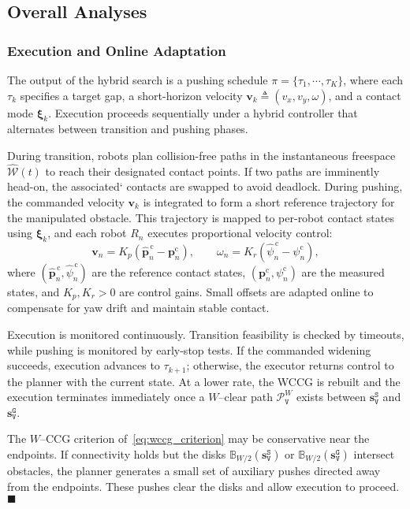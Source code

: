 \subsection{Overall Analyses}\label{subsec:overall}

\subsubsection{Execution and Online Adaptation}\label{subsec:execute}
The output of the hybrid search is a pushing schedule
$\pi=\{\tau_1,\cdots,\tau_K\}$, where each $\tau_k$ specifies a target gap, a
short-horizon velocity $\mathbf{v}_k\triangleq(v_x,v_y,\omega)$, and a contact
mode $\boldsymbol{\xi}_k$. Execution proceeds sequentially under a hybrid
controller that alternates between transition and pushing phases.

During transition, robots plan collision-free paths in the
instantaneous freespace $\widehat{\mathcal{W}}(t)$ to reach their designated
contact points. If two paths are imminently head-on, the associated`
contacts are swapped to avoid deadlock.
During pushing, the commanded velocity $\mathbf{v}_k$ is integrated to form a
short reference trajectory for the manipulated obstacle. This trajectory is
mapped to per-robot contact states using $\boldsymbol{\xi}_k$, and each robot
$R_n$ executes proportional velocity control:
\[
\mathbf{v}_n = K_{\!p}\!\left(\widehat{\mathbf{p}}^{\,\text{c}}_n - \mathbf{p}^{\text{c}}_n\right),
\qquad
\omega_n = K_{\!r}\!\left(\widehat{\psi}^{\,\text{c}}_n - \psi^{\text{c}}_n\right),
\]
where $(\widehat{\mathbf{p}}^{\,\text{c}}_n,\widehat{\psi}^{\,\text{c}}_n)$ are
the reference contact states, $(\mathbf{p}^{\text{c}}_n,\psi^{\text{c}}_n)$ are
the measured states, and $K_{\!p},K_{\!r}>0$ are control gains. Small offsets
are adapted online to compensate for yaw drift and maintain stable contact.

Execution is monitored continuously. Transition feasibility is checked by
timeouts, while pushing is monitored by early-stop tests. If the commanded
widening succeeds, execution advances to $\tau_{k+1}$; otherwise, the
executor returns control to the planner with the current state. At a lower rate,
the WCCG is rebuilt and the execution terminates immediately once a
$W$--clear path $\mathcal{P}^W_\texttt{V}$ exists between
$\mathbf{s}_\texttt{V}^{\texttt{S}}$ and $\mathbf{s}_\texttt{V}^{\texttt{G}}$.

\begin{remark}
The $W$--CCG criterion of~\eqref{eq:wccg_criterion} may be conservative near
the endpoints. If connectivity holds but the disks
$\mathbb{B}_{W/2}(\mathbf{s}_\texttt{V}^{\texttt{S}})$ or
$\mathbb{B}_{W/2}(\mathbf{s}_\texttt{V}^{\texttt{G}})$ intersect obstacles, the
planner generates a small set of auxiliary pushes directed away from the
endpoints. These pushes clear the disks and allow execution to proceed.
\hfill$\blacksquare$
\end{remark}

